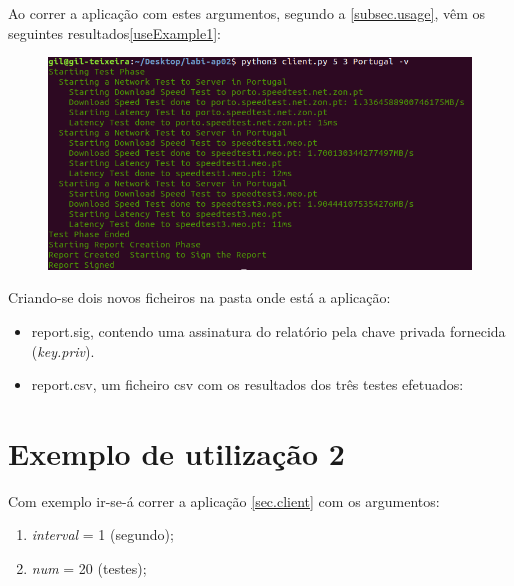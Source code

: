 \documentclass{report}
\begin{document}
Ao correr a aplicação com estes argumentos, segundo a \autoref{subsec.usage}, vêm os seguintes resultados\autoref{useExample1}:\\
\begin{figure}[h]
	\label{useExample1}
\includegraphics[width=\textwidth]{useExample1}
\end{figure}
Criando-se dois novos ficheiros na pasta onde está a aplicação:
\begin{itemize}
\item report.sig, contendo uma assinatura do relatório pela chave privada fornecida (\textit{key.priv}).
\item report.csv, um ficheiro \ac{csv} com os resultados dos três testes efetuados:
\end{itemize}
\begin{table}[h]
\centering
{}
\end{table}

\section{Exemplo de utilização 2}
\label{sec:example2}
Com exemplo ir-se-á correr a aplicação \autoref{sec.client} com os argumentos:
\begin{enumerate}
\item \textit{interval} = 1 (segundo);
\item \textit{num} = 20 (testes);
\end{enumerate}
\end{document}
